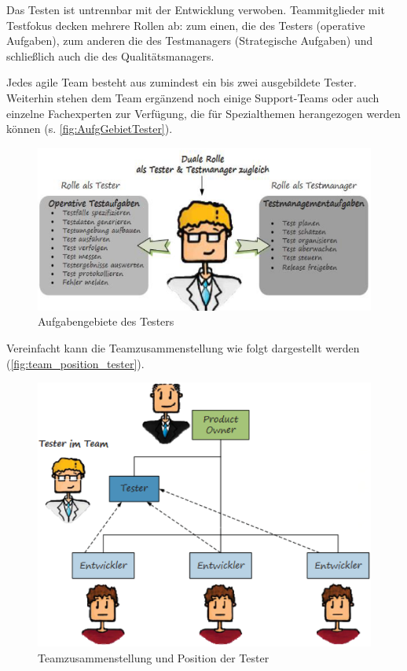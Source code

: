 Das Testen ist untrennbar mit der Entwicklung verwoben. Teammitglieder mit Testfokus decken mehrere Rollen ab: zum einen, die des Testers (operative Aufgaben), zum anderen die des Testmanagers (Strategische Aufgaben) und schließlich auch die des Qualitätsmanagers.

Jedes agile Team besteht aus zumindest ein bis zwei ausgebildete Tester. Weiterhin stehen dem Team ergänzend noch einige Support-Teams oder auch einzelne Fachexperten zur Verfügung, die für Spezialthemen herangezogen werden können (s. \autoref{fig:AufgGebietTester}).

\begin{figure}[!htb]
  \centering
  \includegraphics[width=.9\textwidth]{figures/rebecca/Aufgaben_Tester.png}
  \caption[]{Aufgabengebiete des Testers}
  \label{fig:AufgGebietTester}
\end{figure}

Vereinfacht kann die Teamzusammenstellung wie folgt dargestellt werden (\autoref{fig:team_position_tester}).

\begin{figure}[!htb]
  \centering
  \includegraphics[width=.9\textwidth]{figures/rebecca/Position_Tester.png}
  \caption[]{Teamzusammenstellung und Position der Tester}
  \label{fig:team_position_tester}
\end{figure}

